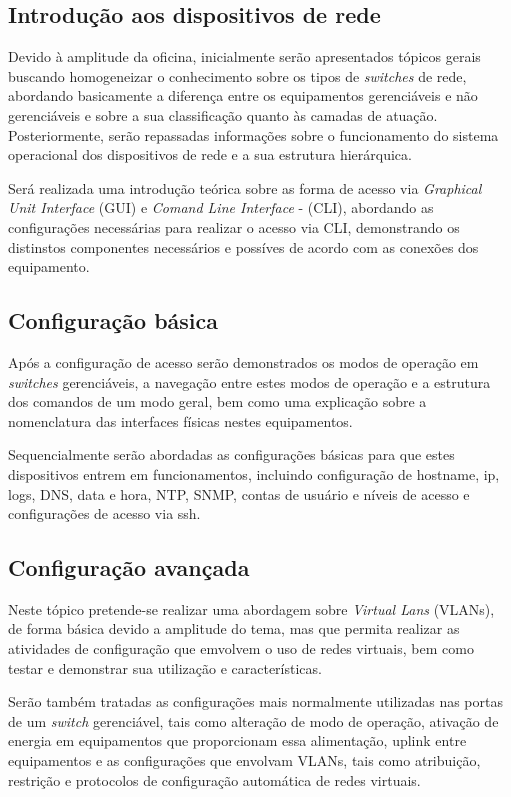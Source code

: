\documentclass[12pt]{article}
\begin{document}
\subsection{Introdução aos dispositivos de rede}

Devido à amplitude da oficina, inicialmente serão apresentados tópicos gerais buscando homogeneizar o conhecimento sobre os tipos de \textit{switches} de rede, abordando basicamente a diferença entre os equipamentos gerenciáveis e não gerenciáveis e sobre a sua classificação quanto às camadas de atuação. Posteriormente, serão repassadas informações sobre o funcionamento do sistema operacional dos dispositivos de rede e a sua estrutura hierárquica. 

Será realizada uma introdução teórica sobre as forma de acesso via \textit{Graphical Unit Interface} (GUI) e \textit{Comand Line Interface} - (CLI), abordando as configurações necessárias para realizar o acesso via CLI, demonstrando os distinstos componentes necessários e possíves de acordo com as conexões dos equipamento.

\subsection{Configuração básica}

Após a configuração de acesso serão demonstrados os modos de operação em \textit{switches} gerenciáveis, a navegação entre estes modos de operação e a estrutura dos comandos de um modo geral, bem como uma explicação sobre a nomenclatura das interfaces físicas nestes equipamentos.

Sequencialmente serão abordadas as configurações básicas para que estes dispositivos entrem em funcionamentos, incluindo configuração de hostname, ip, logs, DNS, data e hora, NTP, SNMP, contas de usuário e níveis de acesso e configurações de acesso via ssh. 

\subsection{Configuração avançada}

Neste tópico pretende-se realizar uma abordagem sobre \textit{Virtual Lans} (VLANs), de forma básica devido a amplitude do tema, mas que permita realizar as atividades de configuração que emvolvem o uso de redes virtuais, bem como testar e demonstrar sua utilização e características. 

Serão também tratadas as configurações mais normalmente utilizadas nas portas de um \textit{switch} gerenciável, tais como alteração de modo de operação, ativação de energia em equipamentos que proporcionam essa alimentação, uplink entre equipamentos e as configurações que envolvam VLANs, tais como atribuição, restrição e protocolos de configuração automática de redes virtuais.
\end{document}
